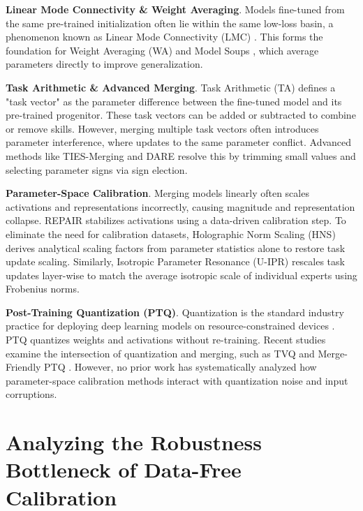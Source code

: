 \documentclass{article}
\theoremstyle{plain}
\theoremstyle{definition}
\theoremstyle{remark}
\begin{document}
\textbf{Linear Mode Connectivity \& Weight Averaging}. Models fine-tuned from the same pre-trained initialization often lie within the same low-loss basin, a phenomenon known as Linear Mode Connectivity (LMC) \cite{entezari2021role, ainsworth2022git}. This forms the foundation for Weight Averaging (WA) and Model Soups \cite{wortsman2022model}, which average parameters directly to improve generalization.

\textbf{Task Arithmetic \& Advanced Merging}. Task Arithmetic (TA) \cite{ilharco2023editing} defines a "task vector" as the parameter difference between the fine-tuned model and its pre-trained progenitor. These task vectors can be added or subtracted to combine or remove skills. However, merging multiple task vectors often introduces parameter interference, where updates to the same parameter conflict. Advanced methods like TIES-Merging \cite{yadav2023ties} and DARE \cite{yu2024language} resolve this by trimming small values and selecting parameter signs via sign election.

\textbf{Parameter-Space Calibration}. Merging models linearly often scales activations and representations incorrectly, causing magnitude and representation collapse. REPAIR \cite{jordan2022repair} stabilizes activations using a data-driven calibration step. To eliminate the need for calibration datasets, Holographic Norm Scaling (HNS) \cite{submission7} derives analytical scaling factors from parameter statistics alone to restore task update scaling. Similarly, Isotropic Parameter Resonance (U-IPR) \cite{submission9} rescales task updates layer-wise to match the average isotropic scale of individual experts using Frobenius norms.

\textbf{Post-Training Quantization (PTQ)}. Quantization is the standard industry practice for deploying deep learning models on resource-constrained devices \cite{dettmers2022llm, frantar2022gptq, xiao2023smoothquant}. PTQ quantizes weights and activations without re-training. Recent studies examine the intersection of quantization and merging, such as TVQ \cite{kim2025task} and Merge-Friendly PTQ \cite{shin2025merge}. However, no prior work has systematically analyzed how parameter-space calibration methods interact with quantization noise and input corruptions.

\vspace{-2.0mm}
\section{Analyzing the Robustness Bottleneck of Data-Free Calibration}
\label{sec:bottleneck}
\vspace{-2.5mm}
\end{document}
